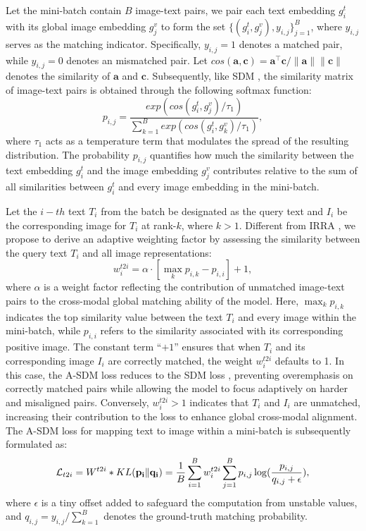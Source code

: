 \documentclass[acmsmall]{acmart}
\begin{document}
Let the mini-batch contain $B$ image-text pairs, we pair each text
embedding $g_i^t$ with its global image embedding $g_j^v$ to form
the set $\{(g_i^t, g_j^v), y_{i,j}\}_{j=1}^B$, where $y_{i,j}$
serves as the matching indicator. Specifically, $y_{i,j}=1$ denotes
a matched pair, while $y_{i,j}=0$ denotes an mismatched pair. Let
$cos(\mathbf{a},\mathbf{c})=\mathbf{a}^{\top}\mathbf{c}/\|\mathbf{a}\|\|\mathbf{c}\|$
denotes the similarity of $\mathbf{a}$ and $\mathbf{c}$.
Subsequently, like SDM \cite{jiang2023cross}, the similarity matrix
of image-text pairs is obtained through the following softmax
function:
\begin{equation}
    p_{i,j}=\frac{exp(cos(g_{i}^{t},g_{j}^{v})/\tau_1)}{\sum_{k=1}^{B}exp(cos(g_{i}^{t},g_{k}^{v})/\tau_1)},
    \label{eq:pij}
\end{equation}
where $\tau_1$ acts as a temperature term that modulates the spread
of the resulting distribution. The probability $p_{i,j}$ quantifies
how much the similarity between the text embedding $g_i^t$ and the
image embedding $g_j^v$ contributes relative to the sum of all
similarities between $g_i^t$ and every image embedding in the
mini-batch.

Let the $i-th$ text $T_i$ from the batch be designated as the query
text and $I_i$ be the corresponding image for $T_i$ at rank-$k$,
where $k > 1$. Different from IRRA \cite{jiang2023cross}, we propose
to derive an adaptive weighting factor by assessing the similarity
between the query text $T_i$ and all image representations:
\begin{equation}
    w_i^{t2i} = \alpha \cdot \left[ \max_k p_{i,k} - p_{i,i} \right] + 1,
    \label{eq:weight}
\end{equation}
where $\alpha$ is a weight factor reflecting the contribution of
unmatched image-text pairs to the cross-modal global matching
ability of the model. Here, $\max_k p_{i,k}$ indicates the top
similarity value between the text $T_i$ and every image within the
mini-batch, while $p_{i,i}$ refers to the similarity associated with
its corresponding positive image. The constant term ``$+1$'' ensures
that when $T_i$ and its corresponding image $I_i$ are correctly
matched, the weight $w_i^{t2i}$ defaults to 1. In this case, the
A-SDM loss reduces to the SDM loss \cite{jiang2023cross}, preventing
overemphasis on correctly matched pairs while allowing the model to
focus adaptively on harder and misaligned pairs. Conversely,
$w_i^{t2i} > 1$ indicates that $T_i$ and $I_i$ are unmatched,
increasing their contribution to the loss to enhance global
cross-modal alignment. The A-SDM loss for mapping text to image
within a mini-batch is subsequently formulated as:
\begin{equation}
    \mathcal{L}_{t2i}=W^{t2i}*KL(\mathbf{p_i\|q_i})\\
    =\frac{1}{B}\sum_{i=1}^{B}w_i^{t2i}\sum_{j=1}^{B}p_{i,j}\log(\frac{p_{i,j}}{q_{i,j}+\epsilon}),
    \label{eq:lt2i}
\end{equation}
where $\epsilon$ is a tiny offset added to safeguard the computation
from unstable values, and $q_{i,j}=y_{i,j}/\sum_{k=1}^{B}$ denotes
the ground-truth matching probability.
\end{document}

